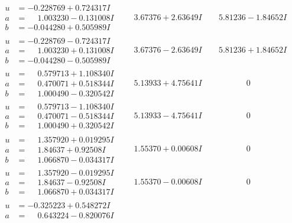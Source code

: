\documentclass[1p]{elsarticle_modified}
\theoremstyle{definition}
\begin{document}
$$\begin{array}{c|c|c}
\begin{aligned}
u &= -0.228769 + 0.724317 I \\
a &= \phantom{-}1.003230 - 0.131008 I \\
b &= -0.044280 + 0.505989 I\end{aligned}
 & \phantom{-}3.67376 + 2.63649 I & \phantom{-}5.81236 - 1.84652 I \\ \hline\begin{aligned}
u &= -0.228769 - 0.724317 I \\
a &= \phantom{-}1.003230 + 0.131008 I \\
b &= -0.044280 - 0.505989 I\end{aligned}
 & \phantom{-}3.67376 - 2.63649 I & \phantom{-}5.81236 + 1.84652 I \\ \hline\begin{aligned}
u &= \phantom{-}0.579713 + 1.108340 I \\
a &= \phantom{-}0.470071 + 0.518344 I \\
b &= \phantom{-}1.000490 - 0.320542 I\end{aligned}
 & \phantom{-}5.13933 + 4.75641 I & \phantom{-0.000000 } 0 \\ \hline\begin{aligned}
u &= \phantom{-}0.579713 - 1.108340 I \\
a &= \phantom{-}0.470071 - 0.518344 I \\
b &= \phantom{-}1.000490 + 0.320542 I\end{aligned}
 & \phantom{-}5.13933 - 4.75641 I & \phantom{-0.000000 } 0 \\ \hline\begin{aligned}
u &= \phantom{-}1.357920 + 0.019295 I \\
a &= \phantom{-}1.84637 + 0.92508 I \\
b &= \phantom{-}1.066870 - 0.034317 I\end{aligned}
 & \phantom{-}1.55370 + 0.00608 I & \phantom{-0.000000 } 0 \\ \hline\begin{aligned}
u &= \phantom{-}1.357920 - 0.019295 I \\
a &= \phantom{-}1.84637 - 0.92508 I \\
b &= \phantom{-}1.066870 + 0.034317 I\end{aligned}
 & \phantom{-}1.55370 - 0.00608 I & \phantom{-0.000000 } 0 \\ \hline\begin{aligned}
u &= -0.325223 + 0.548272 I \\
a &= \phantom{-}0.643224 - 0.820076 I \\

\end{aligned}
\end{array}$$
\end{document}
